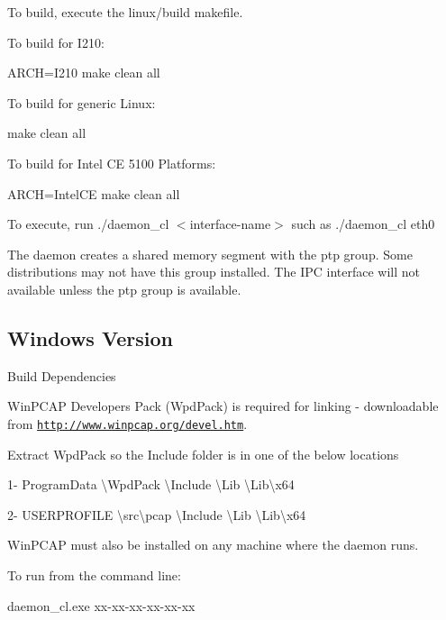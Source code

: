 To build, execute the linux/build makefile.

To build for I210\+:

A\+R\+CH=I210 make clean all

To build for \textquotesingle{}generic\textquotesingle{} Linux\+:

make clean all

To build for Intel CE 5100 Platforms\+:

A\+R\+CH=Intel\+CE make clean all

To execute, run ./daemon\+\_\+cl $<$interface-\/name$>$ such as ./daemon\+\_\+cl eth0

The daemon creates a shared memory segment with the \textquotesingle{}ptp\textquotesingle{} group. Some distributions may not have this group installed. The I\+PC interface will not available unless the \textquotesingle{}ptp\textquotesingle{} group is available.

\subsection*{Windows Version }

Build Dependencies


\begin{DoxyItemize}
\item Win\+P\+C\+AP Developer\textquotesingle{}s Pack (Wpd\+Pack) is required for linking -\/ downloadable from \href{http://www.winpcap.org/devel.htm}{\tt http\+://www.\+winpcap.\+org/devel.\+htm}.
\end{DoxyItemize}

Extract Wpd\+Pack so the Include folder is in one of the below locations

1-\/ Program\+Data \textbackslash{}Wpd\+Pack \textbackslash{}Include \textbackslash{}Lib \textbackslash{}Lib\textbackslash{}x64

2-\/ U\+S\+E\+R\+P\+R\+O\+F\+I\+LE \textbackslash{}src\textbackslash{}pcap \textbackslash{}Include \textbackslash{}Lib \textbackslash{}Lib\textbackslash{}x64


\begin{DoxyItemize}
\item Win\+P\+C\+AP must also be installed on any machine where the daemon runs.
\end{DoxyItemize}

To run from the command line\+: \begin{DoxyVerb}daemon_cl.exe xx-xx-xx-xx-xx-xx
\end{DoxyVerb}


